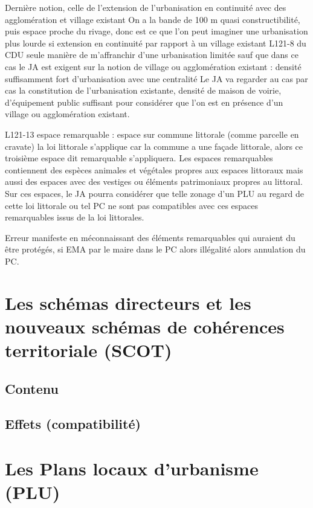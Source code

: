 	Dernière notion, celle de l’extension de l’urbanisation en continuité avec des agglomération et village existant
	On a la bande de 100 m quasi constructibilité, puis espace proche du rivage, donc est ce que l’on peut imaginer une urbanisation plus lourde si extension en continuité par rapport à un village existant L121-8 du CDU seule manière de m’affranchir d’une urbanisation limitée sauf que dans ce cas le JA est exigent sur la notion de village ou agglomération existant : densité suffisamment fort d’urbanisation avec une centralité
	Le JA va regarder au cas par cas la constitution de l’urbanisation existante, densité de maison de voirie, d’équipement public suffisant pour considérer que l’on est en présence d’un village ou agglomération existant.

	L121-13 espace remarquable : espace sur commune littorale (comme parcelle en cravate) la loi littorale s’applique car la commune a une façade littorale, alors ce troisième espace dit remarquable s’appliquera.
	Les espaces remarquables contiennent des espèces animales et végétales propres aux espaces littoraux mais aussi des espaces avec des vestiges ou éléments patrimoniaux propres au littoral. Sur ces espaces, le JA pourra considérer que telle zonage d’un PLU au regard de  cette loi littorale ou tel PC ne sont pas compatibles avec ces espaces remarquables issus de la loi littorales.

	Erreur manifeste en méconnaissant des éléments remarquables qui auraient du être protégés, si EMA par le maire dans le PC alors illégalité alors annulation du PC.


\section{Les schémas directeurs et les nouveaux schémas de cohérences territoriale (SCOT)}

	\subsection{Contenu}

	\subsection{Effets (compatibilité)}

\section{Les Plans locaux d'urbanisme (PLU)}

